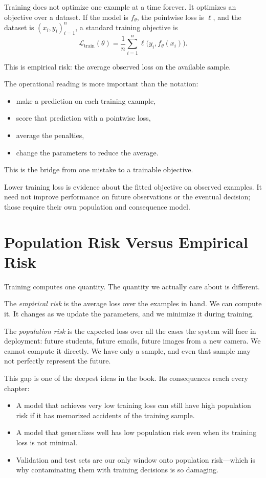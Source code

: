 Training does not optimize one example at a time forever. It optimizes an objective over a dataset. If the model is \(f_\theta\), the pointwise loss is \(\ell\), and the dataset is \((x_i, y_i)_{i=1}^n\), a standard training objective is
\[
\mathcal{L}_{\text{train}}(\theta)
=
\frac{1}{n}
\sum_{i=1}^{n}
\ell\bigl(y_i, f_\theta(x_i)\bigr).
\]

This is empirical risk: the average observed loss on the available sample.

The operational reading is more important than the notation:

\begin{itemize}[leftmargin=*]
\item make a prediction on each training example,
\item score that prediction with a pointwise loss,
\item average the penalties,
\item change the parameters to reduce the average.
\end{itemize}

This is the bridge from one mistake to a trainable objective.

Lower training loss is evidence about the fitted objective on observed examples. It need not improve performance on future observations or the eventual decision; those require their own population and consequence model.

\section*{Population Risk Versus Empirical Risk}

Training computes one quantity. The quantity we actually care about is different.

The \emph{empirical risk} is the average loss over the examples in hand. We can compute it. It changes as we update the parameters, and we minimize it during training.

The \emph{population risk} is the expected loss over all the cases the system will face in deployment: future students, future emails, future images from a new camera. We cannot compute it directly. We have only a sample, and even that sample may not perfectly represent the future.

This gap is one of the deepest ideas in the book. Its consequences reach every chapter:
\begin{itemize}[leftmargin=*]
\item A model that achieves very low training loss can still have high population risk if it has memorized accidents of the training sample.
\item A model that generalizes well has low population risk even when its training loss is not minimal.
\item Validation and test sets are our only window onto population risk---which is why contaminating them with training decisions is so damaging.
\end{itemize}

